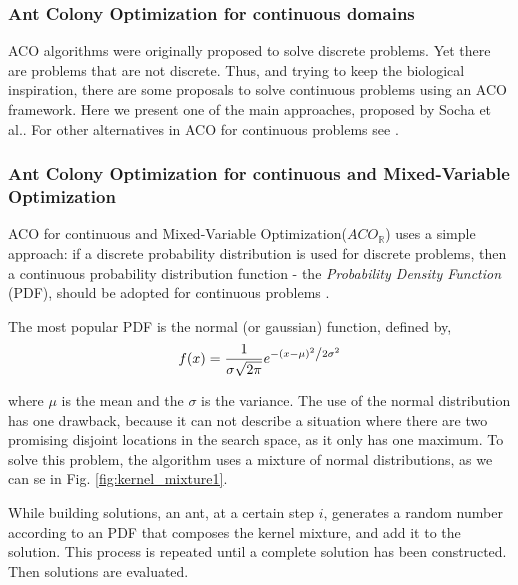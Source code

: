 					\subsubsection*{Ant Colony Optimization for continuous domains}
					ACO algorithms were originally proposed to solve discrete problems. Yet there are problems that are not discrete. Thus, and trying to keep the biological inspiration, there are some proposals to solve continuous problems using an ACO framework. 
					Here we present one of the main approaches, proposed by Socha et al.\cite{socha04}. For other alternatives in ACO for continuous problems see \cite{bilchev95, kong06, tsutsui04}.
					
					
					\subsubsection*{Ant Colony Optimization for continuous and Mixed-Variable Optimization}
					 ACO for continuous and Mixed-Variable Optimization($ACO_\mathbb{R}$) uses a simple approach: if a discrete probability distribution is used for discrete problems, then a continuous probability distribution function - the \emph{Probability Density Function} (PDF), should be adopted for continuous problems \cite{socha04}.

					The most popular PDF is the normal (or gaussian) function, defined by,
						\begin{equation}
							f(x) = \frac{1}{{\sigma \sqrt {2\pi } }}e^{{{ - \left( {x - \mu } \right)^2 } \mathord{\left/ 				{\vphantom {{ - \left( {x - \mu } \right)^2 } {2\sigma ^2 }}} \right. \kern-\nulldelimiterspace} {2\sigma ^2 }}}
						\end{equation}

					\noindent where $\mu$ is the mean and the $\sigma$ is the variance. The use of the normal distribution has one drawback, because it can not describe a situation where there are two promising disjoint locations in the search space, as it only has one maximum. To solve this problem, the algorithm uses a mixture of normal distributions, as we can se in Fig. \ref{fig:kernel_mixture1}. 
					
						
						While building solutions, an ant, at a certain step $i$, generates a random number according to an PDF that composes the kernel mixture, and add it to the solution. This process is repeated until a complete solution has been constructed. Then solutions are evaluated.
						
